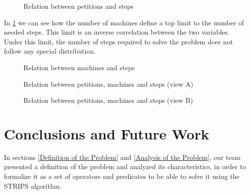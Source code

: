 \documentclass[12pt,a4paper,oneside]{article}
\numberwithin{equation}{section}
\numberwithin{equation}{section}
\theoremstyle{definition}
\begin{document}
\begin{itemize}
\begin{figure}[h!]
	\centering
	\caption{Relation between petitions and steps}
	\label{fig:2d-petitions}
\end{figure}

In \ref{fig:2d-petitions} we can see how the number of machines define a top limit to the number of needed steps. This limit is an inverse correlation between the two variables. Under this limit, the number of steps required to solve the problem does not follow any special distribution.

\begin{figure}[h!]
	\centering
	\caption{Relation between machines and steps}
	\label{fig:2d-machines}
\end{figure}

\newcommand{\plotthreedee}[2]{
	\begin{axis}[
		view={#2}{#1},
		xlabel=Petitions,
		ylabel=Machines,
		zlabel=Steps,
	]
	\addplot3[
		scatter,
		only marks,
	]
	table[
		x=Petitions,
		y=Machines,
		z=Steps,
		col sep=comma,
	]{results.csv};
	\end{axis}
}

\begin{figure}
	\centering
	\caption{Relation between petitions, machines and steps (view A)}
\label{fig:3d-a}
\end{figure}

\begin{figure}
	\centering
	\caption{Relation between petitions, machines and steps (view B)}
	\label{fig:3d-a}
\end{figure}


\newpage

\section{Conclusions and Future Work} \label{Conclusions}

In sections \ref{Definition of the Problem} and \ref{Analysis of the Problem}, our team presented a definition of the problem and analyzed its characteristics, in order to formalize it as a set of operators and predicates to be able to solve it using the STRIPS algorithm.



\end{itemize}
\end{document}
